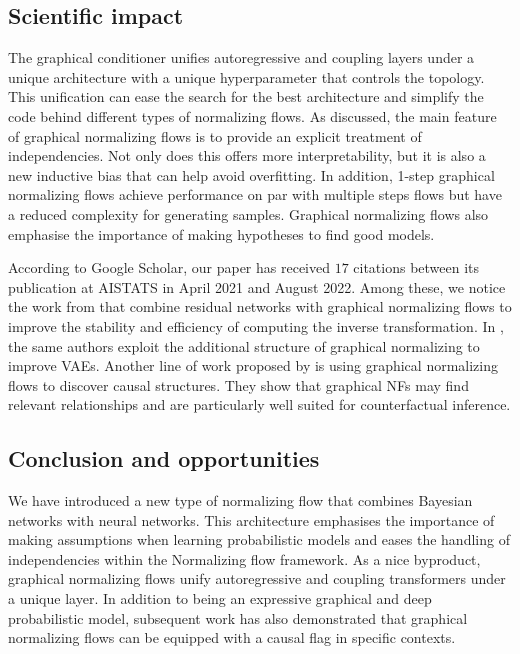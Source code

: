 \subsection{Scientific impact}
The graphical conditioner unifies autoregressive and coupling layers under a unique architecture with a unique hyperparameter that controls the topology. This unification can ease the search for the best architecture and simplify the code behind different types of normalizing flows. As discussed, the main feature of graphical normalizing flows is to provide an explicit treatment of independencies. Not only does this offers more interpretability, but it is also a new inductive bias that can help avoid overfitting. In addition, 1-step graphical normalizing flows achieve performance on par with multiple steps flows but have a reduced complexity for generating samples. Graphical normalizing flows also emphasise the importance of making hypotheses to find good models.

According to Google Scholar, our paper has received $17$ citations between its publication at AISTATS in April 2021 and August 2022. Among these, we notice the work from \citet{mouton2022graphical} that combine residual networks with graphical normalizing flows to improve the stability and efficiency of computing the inverse transformation. In \citet{mouton2022siren}, the same authors exploit the additional structure of graphical normalizing to improve VAEs. Another line of work proposed by \citet{balgi2022personalized} is using graphical normalizing flows to discover causal structures. They show that graphical NFs may find relevant relationships and are particularly well suited for counterfactual inference.

\subsection{Conclusion and opportunities}
We have introduced a new type of normalizing flow that combines Bayesian networks with neural networks. This architecture emphasises the importance of making assumptions when learning probabilistic models and eases the handling of independencies within the Normalizing flow framework. As a nice byproduct, graphical normalizing flows unify autoregressive and coupling transformers under a unique layer. In addition to being an expressive graphical and deep probabilistic model, subsequent work has also demonstrated that graphical normalizing flows can be equipped with a causal flag in specific contexts.

